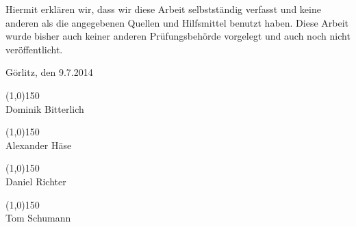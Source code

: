 \thispagestyle{empty}

Hiermit erklären wir, dass wir diese Arbeit selbstständig verfasst und keine anderen als die angegebenen Quellen und Hilfsmittel benutzt haben.
Diese Arbeit wurde bisher auch keiner anderen Prüfungsbehörde vorgelegt und auch noch nicht veröffentlicht.

\vspace{5cm}

Görlitz, den 9.7.2014 %

\vspace{1cm}
\line(1,0){150}\\
Dominik Bitterlich

\vspace{1cm}
\line(1,0){150}\\
Alexander Häse

\vspace{1cm}
\line(1,0){150}\\
Daniel Richter

\vspace{1cm}
\line(1,0){150}\\
Tom Schumann
